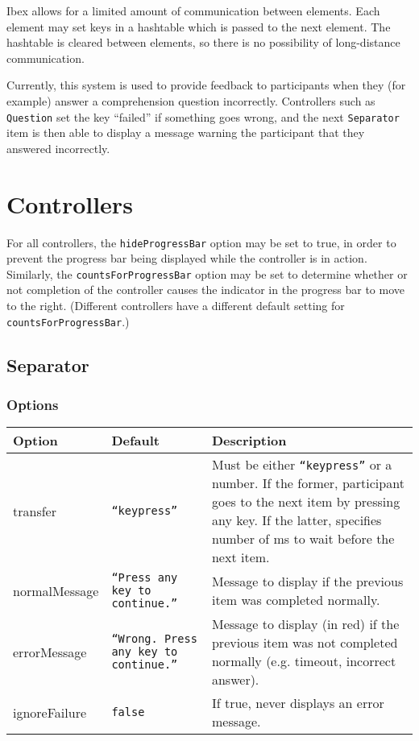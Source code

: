 \documentclass[11pt,letterpaper]{article}
\begin{document}
Ibex allows for a limited amount of communication between elements.  Each
element may set keys in a hashtable which is passed to the next element.  The
hashtable is cleared between elements, so there is no possibility of
long-distance communication.

Currently, this system is used to provide feedback to participants when they
(for example) answer a comprehension question incorrectly.  Controllers such as
\texttt{Question} set the key ``failed'' if something goes wrong, and the next
\texttt{Separator} item is then able to display a message warning the participant that
they answered incorrectly.

\section{Controllers}

For all controllers, the \texttt{hideProgressBar} option may be set to true, in order to prevent the progress
bar being displayed while the controller is in action. Similarly, the \texttt{countsForProgressBar} option
may be set to determine whether or not completion of the controller causes the indicator in the
progress bar to move to the right. (Different controllers have a different default setting for
\texttt{countsForProgressBar}.)

\subsection{Separator}

\subsubsection*{Options}



\footnotesize
\begin{RaggedRight}
\sloppy
\begin{tabular}{|p{1.0928in}|p{1.1429in}|p{3.2643in}|}
\hline
 \textbf{Option}         &  \textbf{Default}     &  \textbf{Description} \\
\hline
 transfer         &  \texttt{``keypress''}  &  Must be either \texttt{``keypress''} or a number. If the former, participant goes to the next item by pressing any key. If the latter, specifies number of ms to wait before the next item. \\
\hline
 normalMessage    &  \texttt{``Press any key to continue.''}  &  Message to display if the previous item was completed normally. \\
\hline
 errorMessage     &  \texttt{``Wrong. Press any key to continue.''}  &  Message to display (in red) if the previous item was not completed normally (e.g. timeout, incorrect answer). \\
\hline
 ignoreFailure    &  \texttt{false}       &  If true, never displays an error message. 
\\\hline
\end{tabular}
\end{RaggedRight}
\fussy
\end{document}
